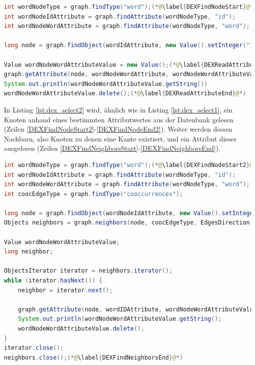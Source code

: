 \documentclass[11pt, a4paper, oneside]{article} %
\begin{document}
\begin{lstlisting}[caption={DEX - Daten abfragen - Knoten wiederfinden},label={lst:dex_select1},language=Java]
int wordNodeType = graph.findType("word");(*@\label{DEXFindNodeStart}@*)
int wordNodeIdAttribute = graph.findAttribute(wordNodeType, "id");
int wordNodeWordAttribute = graph.findAttribute(wordNodeType, "word");

long node = graph.findObject(wordIdAttribute, new Value().setInteger("1"));(*@\label{DEXFindNodeEnd}@*)

Value wordNodeWordAttributeValue = new Value();(*@\label{DEXReadAttributeStart}@*)
graph.getAttribute(node, wordNodeWordAttribute, wordNodeWordAttributeValue);
System.out.println(wordNodeWordAttributeValue.getString())
wordNodeWordAttributeValue.delete();(*@\label{DEXReadAttributeEnd}@*)
\end{lstlisting}

In Listing \ref{lst:dex_select2} wird, ähnlich wie in Listing \ref{lst:dex_select1}, ein Knoten anhand eines bestimmten Attributwertes aus der Datenbank gelesen (Zeilen \ref{DEXFindNodeStart2}-\ref{DEXFindNodeEnd2}). Weiter werden dessen Nachbarn, also Knoten zu denen eine Kante existiert, und ein Attribut dieser ausgelesen (Zeilen \ref{DEXFindNeighborsStart}-\ref{DEXFindNeighborsEnd}).

\begin{lstlisting}[caption={DEX - Daten abfragen - alle Nachbarn eines Knotens},label={lst:dex_select2},language=Java]
int wordNodeType = graph.findType("word");(*@\label{DEXFindNodeStart2}@*)
int wordNodeIdAttribute = graph.findAttribute(wordNodeType, "id");
int wordNodeWordAttribute = graph.findAttribute(wordNodeType, "word");
int coocEdgeType = graph.findType("cooccurrences");

long node = graph.findObject(wordNodeIdAttribute, new Value().setInteger("1"));(*@\label{DEXFindNodeEnd2}@*)
Objects neighbors = graph.neighbors(node, coocEdgeType, EdgesDirection.Outgoing);(*@\label{DEXFindNeighborsStart}@*)

Value wordNodeWordAttributeValue;
long neighbor;

ObjectsIterator iterator = neighbors.iterator();
while (iterator.hasNext()) {
	neighbor = iterator.next();

	graph.getAttribute(node, wordIDAttribute, wordNodeWordAttributeValue = new Value());
	System.out.println(wordNodeWordAttributeValue.getString();
	wordNodeWordAttributeValue.delete();
}
iterator.close();
neighbors.close();(*@\label{DEXFindNeighborsEnd}@*)
\end{lstlisting}
\end{document}
